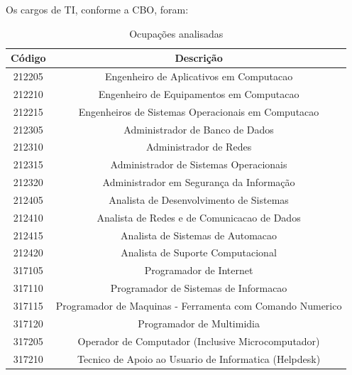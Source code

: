 Os cargos de TI, conforme a CBO, foram:

\begin{table}[htbp]
	\caption{Ocupações analisadas}
	\begin{center}
		\begin{tabular}{|c|c|}
			\hline
			\textbf{Código} & \textbf{Descrição}                                      \\ 
			\hline
			212205           & Engenheiro de Aplicativos em Computacao                   \\
			212210           & Engenheiro de Equipamentos em Computacao                  \\
			212215           & Engenheiros de Sistemas Operacionais em Computacao        \\
			\hline 										
			212305           & Administrador de Banco de Dados                           \\
			212310           & Administrador de Redes                                    \\
			212315           & Administrador de Sistemas Operacionais                    \\
			212320           & Administrador em Segurança da Informação               \\
			\hline 									
			212405           & Analista de Desenvolvimento de Sistemas                   \\
			212410           & Analista de Redes e de Comunicacao de Dados               \\
			212415           & Analista de Sistemas de Automacao                         \\
			212420           & Analista de Suporte Computacional                         \\
			\hline 									
			317105           & Programador de Internet                                   \\
			317110           & Programador de Sistemas de Informacao                     \\
			317115           & Programador de Maquinas - Ferramenta com Comando Numerico \\
			317120           & Programador de Multimidia                                 \\
			\hline 									
			317205           & Operador de Computador (Inclusive Microcomputador)        \\
			317210           & Tecnico de Apoio ao Usuario de Informatica (Helpdesk)     \\
			\hline
		\end{tabular}
		\label{ocupacoes}
	\end{center}
\end{table}